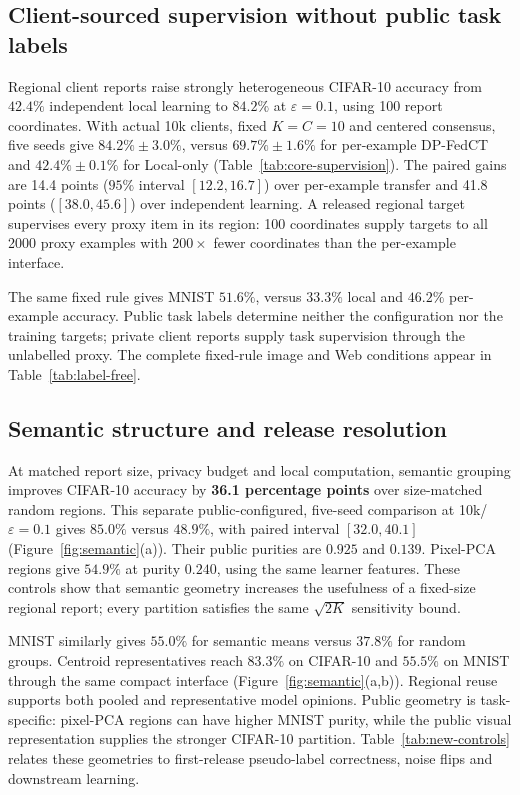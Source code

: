 \subsection{Client-sourced supervision without public task labels}
\label{sec:eval:main}

Regional client reports raise strongly heterogeneous CIFAR-10 accuracy from
$42.4\%$ independent local learning to $84.2\%$ at $\varepsilon=0.1$,
using 100 report coordinates. With actual 10k clients, fixed $K=C=10$ and
centered consensus, five seeds give $84.2\%\pm3.0\%$, versus
$69.7\%\pm1.6\%$ for per-example DP-FedCT and
$42.4\%\pm0.1\%$ for Local-only (Table~\ref{tab:core-supervision}).
The paired gains are 14.4 points ($95\%$ interval $[12.2,16.7]$) over
per-example transfer and 41.8 points ($[38.0,45.6]$) over independent learning.
A released regional target supervises every proxy item in its region:
100 coordinates supply targets to all 2000 proxy examples with
$200\times$ fewer coordinates than the per-example interface.

The same fixed rule gives MNIST $51.6\%$, versus $33.3\%$ local and
$46.2\%$ per-example accuracy. Public task labels determine neither the
configuration nor the training targets; private client reports supply task
supervision through the unlabelled proxy. The complete fixed-rule image and
Web conditions appear in Table~\ref{tab:label-free}.

\subsection{Semantic structure and release resolution}
\label{sec:eval:semantic}

At matched report size, privacy budget and local computation, semantic grouping
improves CIFAR-10 accuracy by \textbf{36.1 percentage points} over size-matched
random regions. This separate public-configured, five-seed comparison at
10k/$\varepsilon=0.1$ gives $85.0\%$ versus $48.9\%$, with paired interval
$[32.0,40.1]$ (Figure~\ref{fig:semantic}(a)). Their public purities are
$0.925$ and $0.139$. Pixel-PCA regions give $54.9\%$ at purity $0.240$,
using the same learner features. These controls show that semantic geometry
increases the usefulness of a fixed-size regional report; every partition
satisfies the same $\sqrt{2K}$ sensitivity bound.

MNIST similarly gives $55.0\%$ for semantic means versus $37.8\%$ for random
groups. Centroid representatives reach $83.3\%$ on CIFAR-10 and $55.5\%$ on
MNIST through the same compact interface (Figure~\ref{fig:semantic}(a,b)).
Regional reuse supports both pooled and representative model opinions.
Public geometry is task-specific: pixel-PCA regions can have higher MNIST
purity, while the public visual representation supplies the stronger CIFAR-10
partition. Table~\ref{tab:new-controls} relates these geometries to first-release
pseudo-label correctness, noise flips and downstream learning.

